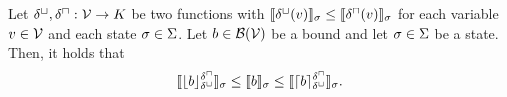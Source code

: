 \begin{theorem}
  Let $\delta^\sqcup, \delta^\sqcap: \mathcal{V} \rightarrow K$ be two functions with $\llbracket \delta^\sqcup(v) \rrbracket_{\sigma} \leq \llbracket \delta^\sqcap(v) \rrbracket_{\sigma}$ for each variable $v \in \mathcal{V}$ and each state $\sigma \in \Sigma$.
  Let $b \in \mathcal{B}(\mathcal{V})$ be a bound and let $\sigma \in \Sigma$ be a state.
  Then, it holds that
  \[ \llbracket \lfloor b \rfloor^{\delta^\sqcap}_{\delta^\sqcup} \rrbracket_{\sigma} \leq \llbracket b \rrbracket_{\sigma} \leq \llbracket \lceil b \rceil^{\delta^\sqcap}_{\delta^\sqcup} \rrbracket_{\sigma}. \]
\end{theorem}

